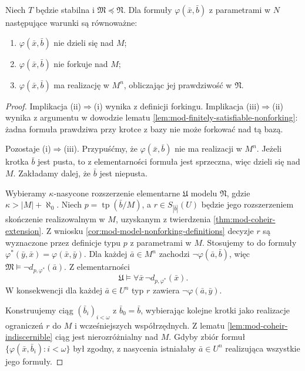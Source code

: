 \begin{twierdzenie}
\label{thm:mod-dividing-forking-model}
Niech $T$ będzie stabilna i
$\mathfrak M\preccurlyeq\mathfrak N$.
Dla formuły $\varphi(\bar x,\bar b)$
z parametrami w $N$ następujące warunki
są równoważne:
\begin{enumerate}[label=(\roman*)]
\item $\varphi(\bar x,\bar b)$ nie dzieli się nad $M$;
\item $\varphi(\bar x,\bar b)$ nie forkuje nad $M$;
\item $\varphi(\bar x,\bar b)$ ma realizację w $M^n$,
obliczając jej prawdziwość w $\mathfrak N$.
\end{enumerate}
\end{twierdzenie}
\begin{proof}
Implikacja (ii)$\Rightarrow$(i) wynika
z definicji forkingu.
Implikacja (iii)$\Rightarrow$(ii) wynika
z argumentu w dowodzie lematu
\ref{lem:mod-finitely-satisfiable-nonforking}:
żadna formuła prawdziwa przy krotce
z bazy nie może forkować nad tą bazą.

Pozostaje (i)$\Rightarrow$(iii).
Przypuśćmy, że $\varphi(\bar x,\bar b)$
nie ma realizacji w $M^n$.
Jeżeli krotka $\bar b$ jest pusta, to
z elementarności formuła jest sprzeczna,
więc dzieli się nad $M$.
Zakładamy dalej, że $\bar b$ jest niepusta.

Wybieramy $\kappa$-nasycone rozszerzenie
elementarne $\mathfrak U$ modelu $\mathfrak N$,
gdzie $\kappa>|M|+\aleph_0$.
Niech $p=\operatorname{tp}(\bar b/M)$,
a $r\in S_{|\bar b|}(U)$ będzie jego rozszerzeniem
skończenie realizowalnym w $M$,
uzyskanym z twierdzenia
\ref{thm:mod-coheir-extension}.
Z wniosku \ref{cor:mod-model-nonforking-definitions}
decyzje $r$ są wyznaczone przez definicje
typu $p$ z parametrami w $M$.
Stosujemy to do formuły
$\varphi^*(\bar y,\bar x)=\varphi(\bar x,\bar y)$.
Dla każdej $\bar a\in M^n$ zachodzi
$\neg\varphi(\bar a,\bar b)$, więc
$\mathfrak M\models\neg d_{p,\varphi^*}(\bar a)$.
Z elementarności
\[
\mathfrak U\models\forall\bar x\,
\neg d_{p,\varphi^*}(\bar x).
\]
W konsekwencji dla każdej $\bar a\in U^n$
typ $r$ zawiera $\neg\varphi(\bar a,\bar y)$.

Konstruujemy ciąg $(\bar b_i)_{i<\omega}$
z $\bar b_0=\bar b$, wybierając kolejne
krotki jako realizacje ograniczeń $r$
do $M$ i wcześniejszych współrzędnych.
Z lematu \ref{lem:mod-coheir-indiscernible}
ciąg jest nierozróżnialny nad $M$.
Gdyby zbiór formuł
$\{\varphi(\bar x,\bar b_i):i<\omega\}$
był zgodny, z nasycenia istniałaby
$\bar a\in U^n$ realizująca wszystkie
jego formuły.


\end{proof}
